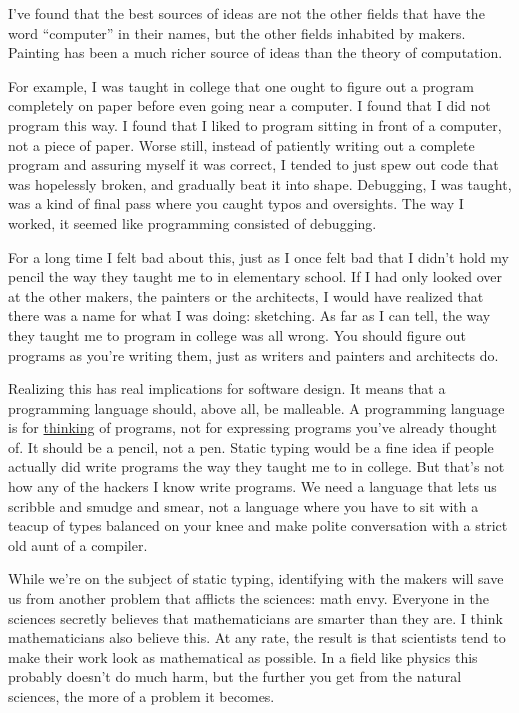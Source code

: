 I've found that the best sources of ideas are not the other fields that
have the word ``computer'' in their names, but the other fields
inhabited by makers. Painting has been a much richer source of ideas
than the theory of computation.

For example, I was taught in college that one ought to figure out a
program completely on paper before even going near a computer. I found
that I did not program this way. I found that I liked to program sitting
in front of a computer, not a piece of paper. Worse still, instead of
patiently writing out a complete program and assuring myself it was
correct, I tended to just spew out code that was hopelessly broken, and
gradually beat it into shape. Debugging, I was taught, was a kind of
final pass where you caught typos and oversights. The way I worked, it
seemed like programming consisted of debugging.

For a long time I felt bad about this, just as I once felt bad that I
didn't hold my pencil the way they taught me to in elementary school. If
I had only looked over at the other makers, the painters or the
architects, I would have realized that there was a name for what I was
doing: sketching. As far as I can tell, the way they taught me to
program in college was all wrong. You should figure out programs as
you're writing them, just as writers and painters and architects do.

Realizing this has real implications for software design. It means that
a programming language should, above all, be malleable. A programming
language is for \href{piraha.html}{thinking} of programs, not for
expressing programs you've already thought of. It should be a pencil,
not a pen. Static typing would be a fine idea if people actually did
write programs the way they taught me to in college. But that's not how
any of the hackers I know write programs. We need a language that lets
us scribble and smudge and smear, not a language where you have to sit
with a teacup of types balanced on your knee and make polite
conversation with a strict old aunt of a compiler.

While we're on the subject of static typing, identifying with the makers
will save us from another problem that afflicts the sciences: math envy.
Everyone in the sciences secretly believes that mathematicians are
smarter than they are. I think mathematicians also believe this. At any
rate, the result is that scientists tend to make their work look as
mathematical as possible. In a field like physics this probably doesn't
do much harm, but the further you get from the natural sciences, the
more of a problem it becomes.

